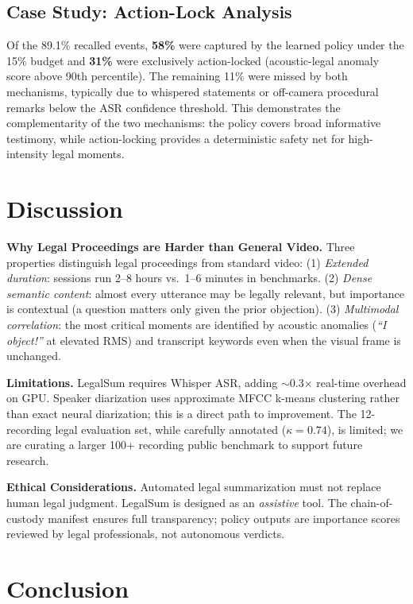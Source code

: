 \documentclass[letterpaper]{article} %
\begin{document}
\subsection{Case Study: Action-Lock Analysis}

Of the 89.1\% recalled events, \textbf{58\%} were captured by the learned policy under the 15\% budget and \textbf{31\%} were exclusively action-locked (acoustic-legal anomaly score above 90th percentile). The remaining 11\% were missed by both mechanisms, typically due to whispered statements or off-camera procedural remarks below the ASR confidence threshold. This demonstrates the complementarity of the two mechanisms: the policy covers broad informative testimony, while action-locking provides a deterministic safety net for high-intensity legal moments.

\section{Discussion}

\textbf{Why Legal Proceedings are Harder than General Video.} Three properties distinguish legal proceedings from standard video: (1) \emph{Extended duration}: sessions run 2--8 hours vs.\ 1--6 minutes in benchmarks. (2) \emph{Dense semantic content}: almost every utterance may be legally relevant, but importance is contextual (a question matters only given the prior objection). (3) \emph{Multimodal correlation}: the most critical moments are identified by acoustic anomalies (\emph{``I object!''} at elevated RMS) and transcript keywords even when the visual frame is unchanged.

\textbf{Limitations.} LegalSum requires Whisper ASR, adding $\sim$0.3$\times$ real-time overhead on GPU. Speaker diarization uses approximate MFCC k-means clustering rather than exact neural diarization; this is a direct path to improvement. The 12-recording legal evaluation set, while carefully annotated ($\kappa=0.74$), is limited; we are curating a larger 100+ recording public benchmark to support future research.

\textbf{Ethical Considerations.} Automated legal summarization must not replace human legal judgment. LegalSum is designed as an \emph{assistive} tool. The chain-of-custody manifest ensures full transparency; policy outputs are importance scores reviewed by legal professionals, not autonomous verdicts.

\section{Conclusion}
\end{document}
